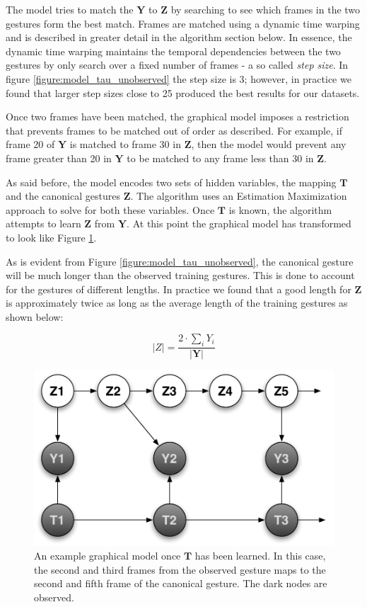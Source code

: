 \documentclass{article}
\begin{document}
The model tries to match the $\mathbf{Y}$ to $\mathbf{Z}$ by searching to see
which frames in the two gestures form the best match. Frames are matched using a
dynamic time warping and is described in greater detail in the algorithm section
below. In essence, the dynamic time warping maintains the temporal dependencies
between the two gestures by only search over a fixed number of frames - a so
called \emph{step size}. In figure \ref{figure:model_tau_unobserved} the step
size is 3; however, in practice we found that larger step sizes close to 25
produced the best results for our datasets.

Once two frames have been matched, the graphical model imposes a restriction
that prevents frames to be matched out of order as described. For example, if
frame 20 of $\mathbf{Y}$ is matched to frame 30 in $\mathbf{Z}$, then the model
would prevent any frame greater than 20 in $\mathbf{Y}$ to be matched to any
frame less than 30 in $\mathbf{Z}$.

As said before, the model encodes two sets of hidden variables, the mapping
$\mathbf{T}$ and the canonical gestures $\mathbf{Z}$. The algorithm uses an
Estimation Maximization approach to solve for both these variables. Once
$\mathbf{T}$ is known, the algorithm attempts to learn $\mathbf{Z}$ from
$\mathbf{Y}$. At this point the graphical model has transformed to look like
Figure \ref{figure:model_tau_observed}.

As is evident from Figure \ref{figure:model_tau_unobserved}, the canonical
gesture will be much longer than the observed training gestures. This is done to
account for the gestures of different lengths. In practice we found that a good
length for $\mathbf{Z}$ is approximately twice as long as the average length of
the training gestures as shown below:

\[
	|Z| = \frac{2 \cdot \sum_{i}{Y_i}}{|\mathbf{Y}|}
\]

\begin{figure}
\begin{centering}
\includegraphics[width=0.63\columnwidth]{figures/model_tau_observed.pdf}

\caption{An example graphical model once $\mathbf{T}$ has been learned. In this
case, the second and third frames from the observed gesture maps to the second
and fifth frame of the canonical gesture. The dark nodes are observed.
\label{figure:model_tau_observed}}

\end{centering}
\end{figure}
\end{document}
